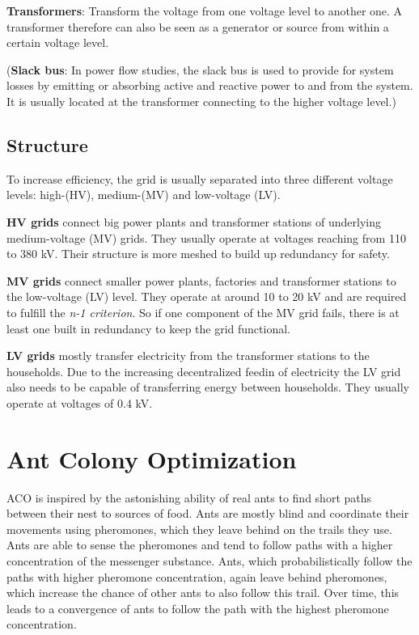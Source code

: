 \textbf{Transformers}: Transform the voltage from one voltage level to another one. A transformer therefore can also be seen as a generator or source from within a certain voltage level.

(\textbf{Slack bus}: In power flow studies, the slack bus is used to provide for system losses by emitting or absorbing active and reactive power to and from the system. It is usually located at the transformer connecting to the higher voltage level.)

\subsection{Structure}
To increase efficiency, the grid is usually separated into three different voltage levels: high-(HV), medium-(MV) and low-voltage (LV).

\textbf{HV grids} connect big power plants and transformer stations of underlying medium-voltage (MV) grids. They usually operate at voltages reaching from 110 to 380 kV. Their structure is more meshed to build up redundancy for safety.

\textbf{MV grids} connect smaller power plants, factories and transformer stations to the low-voltage (LV) level. They operate at around 10 to 20 kV and are required to fulfill the \textit{n-1 criterion}. So if one component of the MV grid fails, there is at least one built in redundancy to keep the grid functional.

\textbf{LV grids} mostly transfer electricity from the transformer stations to the households. Due to the increasing decentralized feedin of electricity the LV grid also needs to be capable of transferring energy between households. They usually operate at voltages of 0.4 kV.\\





\section{Ant Colony Optimization}\label{ACO}
ACO is inspired by the astonishing ability of real ants to find short paths between their nest to sources of food. Ants are mostly blind and coordinate their movements using pheromones, which they leave behind on the trails they use. Ants are able to sense the pheromones and tend to follow paths with a higher concentration of the messenger substance. Ants, which probabilistically follow the paths with higher pheromone concentration, again leave behind pheromones, which increase the chance of other ants to also follow this trail. Over time, this leads to a convergence of ants to follow the path with the highest pheromone concentration.


